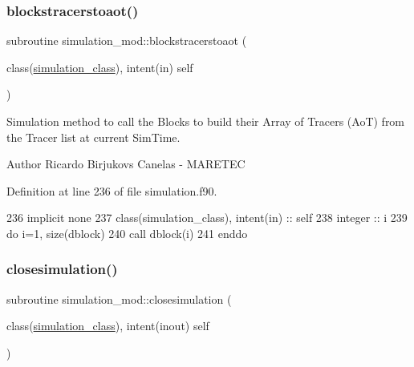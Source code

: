 \subsubsection{\texorpdfstring{blockstracerstoaot()}{blockstracerstoaot()}}
{\footnotesize\ttfamily subroutine simulation\+\_\+mod\+::blockstracerstoaot (\begin{DoxyParamCaption}\item[{class(\mbox{\hyperlink{structsimulation__mod_1_1simulation__class}{simulation\+\_\+class}}), intent(in)}]{self }\end{DoxyParamCaption})\hspace{0.3cm}{\ttfamily [private]}}



Simulation method to call the Blocks to build their Array of Tracers (AoT) from the Tracer list at current Sim\+Time. 

\begin{DoxyAuthor}{Author}
Ricardo Birjukovs Canelas -\/ M\+A\+R\+E\+T\+EC 
\end{DoxyAuthor}


Definition at line 236 of file simulation.\+f90.


\begin{DoxyCode}
236         \textcolor{keywordtype}{implicit none}
237         \textcolor{keywordtype}{class}(simulation\_class), \textcolor{keywordtype}{intent(in)} :: self        
238         \textcolor{keywordtype}{integer} :: i
239         \textcolor{keywordflow}{do} i=1, \textcolor{keyword}{size}(dblock)
240             \textcolor{keyword}{call }dblock(i)%
241 \textcolor{keywordflow}{        enddo}
\end{DoxyCode}
\mbox{\label{namespacesimulation__mod_a4285722eaa589fa671233554b54c74f8}} 
\subsubsection{\texorpdfstring{closesimulation()}{closesimulation()}}
{\footnotesize\ttfamily subroutine simulation\+\_\+mod\+::closesimulation (\begin{DoxyParamCaption}\item[{class(\mbox{\hyperlink{structsimulation__mod_1_1simulation__class}{simulation\+\_\+class}}), intent(inout)}]{self }\end{DoxyParamCaption})\hspace{0.3cm}{\ttfamily [private]}}



